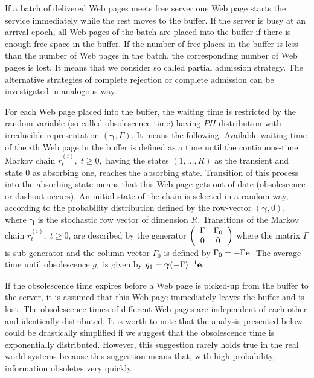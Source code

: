 \documentclass[11pt]{article}
\begin{document}
If a batch of delivered Web pages meets free server one
Web page starts the service immediately while the rest moves to the
buffer. If the server is busy at an arrival epoch, all Web pages of
the batch are placed into the buffer if there is enough free space
in the buffer. If the number of free places in the buffer is less
than the number of Web pages in the batch, the corresponding number
of Web pages is lost. It means that we consider so called partial
admission strategy. The alternative strategies of complete rejection
or complete admission can be investigated in analogous way.

For each Web page placed into the buffer, the waiting time is
 restricted by the random
variable (so called obsolescence time) having $PH$ distribution with
irreducible representation $({\boldsymbol \gamma}, \Gamma).$ It
means the following. Available waiting time of the $i$th Web page in
the buffer is defined as a time   until the continuous-time Markov
chain $r_t^{(i)},\; t \ge 0,$ having the states $(1,\dots,R)$ as the
transient and state $0$ as absorbing one, reaches the absorbing
state. Transition of this process into the absorbing state means
that this Web page gets out of date (obsolescence or dashout
occurs). An initial state of the chain is selected in a random way,
according to the probability distribution defined by the row-vector
$({\boldsymbol \gamma},0)$, where ${\boldsymbol \gamma}$ is the
stochastic row vector of dimension $R$. Transitions of the Markov
chain $r_t^{(i)},\;t \geq 0$, are described by the generator $
\left(
\begin{array}{cc}
 \Gamma& \Gamma_0\cr 0&0
\end{array}
\right)$
 where the matrix $\Gamma$ is sub-generator and the column
vector $\Gamma_0$ is defined by $\Gamma_0=-\Gamma{\bf e}.$
 The average  time until obsolescence $g_1$ is given by $g_1={\boldsymbol
\gamma}(-\Gamma)^{-1}{\bf e}.$

If the obsolescence time expires before a Web page is picked-up from
the buffer to the server, it is assumed  that this Web page
immediately leaves the buffer and is lost. The obsolescence times of
different Web pages are independent of each other and identically
distributed. It is worth to note that the analysis presented below
could be drastically simplified if we suggest that the obsolescence
time is exponentially distributed. However, this suggestion rarely
holds true in the real world systems because this suggestion means
that, with high probability, information obsoletes very quickly.
\end{document}
